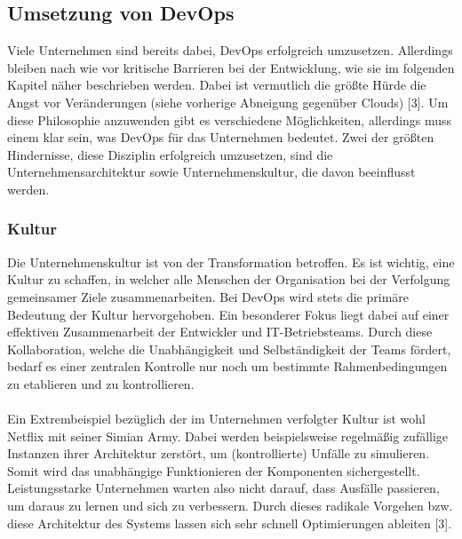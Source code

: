 \subsection{Umsetzung von DevOps}
Viele Unternehmen sind bereits dabei, DevOps erfolgreich umzusetzen. Allerdings bleiben nach wie vor kritische Barrieren bei der Entwicklung, wie sie im folgenden Kapitel näher beschrieben werden. Dabei ist vermutlich die größte Hürde die Angst vor Veränderungen (siehe vorherige Abneigung gegenüber Clouds) [3]. Um diese Philosophie anzuwenden gibt es verschiedene Möglichkeiten, allerdings muss einem klar sein, was DevOps für das Unternehmen bedeutet. Zwei der größten Hindernisse, diese Disziplin erfolgreich umzusetzen, sind die Unternehmensarchitektur sowie Unternehmenskultur, die davon beeinflusst werden.

\subsubsection{Kultur}
Die Unternehmenskultur ist von der Transformation betroffen. Es ist wichtig, eine Kultur zu schaffen, in welcher alle Menschen der Organisation bei der Verfolgung gemeinsamer Ziele zusammenarbeiten. Bei DevOps wird stets die primäre Bedeutung der Kultur hervorgehoben. Ein besonderer Fokus liegt dabei auf einer effektiven Zusammenarbeit der Entwickler und IT-Betriebsteams. Durch diese Kollaboration, welche die Unabhängigkeit und Selbständigkeit der Teams fördert, bedarf es einer zentralen Kontrolle nur noch um bestimmte Rahmenbedingungen zu etablieren und zu kontrollieren.\\ \\    
Ein Extrembeispiel bezüglich der im Unternehmen verfolgter Kultur ist wohl Netflix mit seiner Simian Army. Dabei werden beispielsweise regelmäßig zufällige Instanzen ihrer Architektur zerstört, um (kontrollierte) Unfälle zu simulieren. Somit wird das unabhängige Funktionieren der Komponenten sichergestellt. Leistungsstarke Unternehmen warten also nicht darauf, dass Ausfälle passieren, um daraus zu lernen und sich zu verbessern. Durch dieses radikale Vorgehen bzw. diese Architektur des Systems lassen sich sehr schnell Optimierungen ableiten [3].

